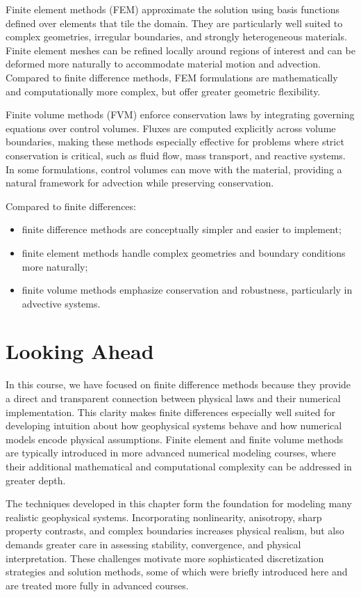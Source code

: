Finite element methods (FEM) approximate the solution using basis functions defined over elements that tile the domain. They are particularly well suited to complex geometries, irregular boundaries, and strongly heterogeneous materials.  Finite element meshes can be refined locally around regions of interest and can be deformed more naturally to accommodate material motion and advection.  Compared to finite difference methods, FEM formulations are mathematically and computationally more complex, but offer greater geometric flexibility.

Finite volume methods (FVM) enforce conservation laws by integrating governing equations over control volumes. Fluxes are computed explicitly across volume boundaries, making these methods especially effective for problems where strict conservation is critical, such as fluid flow, mass transport, and reactive systems. In some formulations, control volumes can move with the material, providing a natural framework for advection while preserving conservation.

Compared to finite differences:
\begin{itemize}
  \item finite difference methods are conceptually simpler and easier to implement;
  \item finite element methods handle complex geometries and boundary conditions more naturally;
  \item finite volume methods emphasize conservation and robustness, particularly in advective systems.
\end{itemize}

\section{Looking Ahead}

In this course, we have focused on finite difference methods because they provide a direct and transparent connection between physical laws and their numerical implementation. This clarity makes finite differences especially well suited for developing intuition about how geophysical systems behave and how numerical models encode physical assumptions. Finite element and finite volume methods are typically introduced in more advanced numerical modeling courses, where their additional mathematical and computational complexity can be addressed in greater depth.

The techniques developed in this chapter form the foundation for modeling many realistic geophysical systems. Incorporating nonlinearity, anisotropy, sharp property contrasts, and complex boundaries increases physical realism, but also demands greater care in assessing stability, convergence, and physical interpretation. These challenges motivate more sophisticated discretization strategies and solution methods, some of which were briefly introduced here and are treated more fully in advanced courses.


